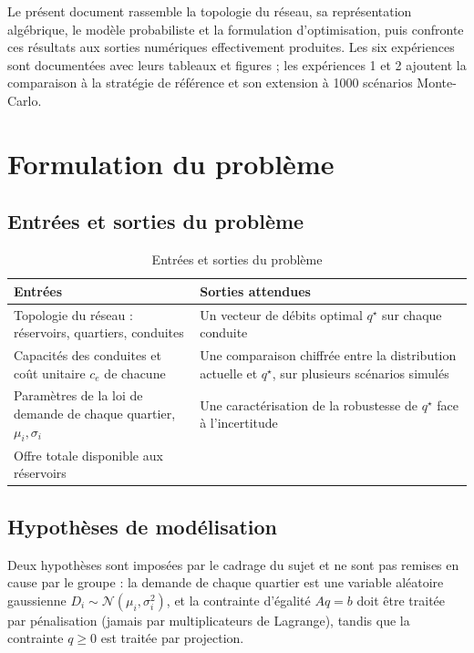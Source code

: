 \documentclass[11pt]{ama-article}
\begin{document}
Le présent document rassemble la topologie du réseau, sa représentation algébrique, le modèle
probabiliste et la formulation d'optimisation, puis confronte ces résultats aux sorties
numériques effectivement produites. Les six expériences sont documentées avec leurs tableaux
et figures ; les expériences 1 et 2 ajoutent la comparaison à la stratégie de référence et son
extension à 1000 scénarios Monte-Carlo.


\section{Formulation du problème}
\label{sec:formulation}


\subsection{Entrées et sorties du problème}

\begin{table}[h!]
\centering
\begin{tabular}{>{\raggedright\arraybackslash}p{7cm}>{\raggedright\arraybackslash}p{7cm}}
\toprule
\textbf{Entrées} & \textbf{Sorties attendues} \\
\midrule
Topologie du réseau : réservoirs, quartiers, conduites &
Un vecteur de débits optimal $q^\star$ sur chaque conduite \\
Capacités des conduites et coût unitaire $c_e$ de chacune &
Une comparaison chiffrée entre la distribution actuelle et $q^\star$, sur plusieurs scénarios simulés \\
Paramètres de la loi de demande de chaque quartier, $\mu_i,\sigma_i$ &
Une caractérisation de la robustesse de $q^\star$ face à l'incertitude \\
Offre totale disponible aux réservoirs & \\
\bottomrule
\end{tabular}
\caption{Entrées et sorties du problème}
\end{table}

\subsection{Hypothèses de modélisation}

Deux hypothèses sont imposées par le cadrage du sujet et ne sont pas remises en cause par le
groupe : la demande de chaque quartier est une variable aléatoire gaussienne
$D_i \sim \mathcal{N}(\mu_i,\sigma_i^2)$, et la contrainte d'égalité $Aq=b$ doit être traitée
par pénalisation (jamais par multiplicateurs de Lagrange), tandis que la contrainte
$q\ge 0$ est traitée par projection.
\end{document}
